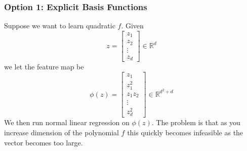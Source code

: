 \documentclass[11pt]{article}
\begin{document}
\subsubsection*{Option 1: Explicit Basis Functions}
Suppose we want to learn quadratic $f$. Given 
\[z = 
\begin{bmatrix}
z_1 \\ z_2 \\ \vdots \\ z_d
\end{bmatrix} \in \mathbb{R}^d
\] we let the feature map be
\[
\phi(z) = 
\begin{bmatrix}
z_1 \\ z_1^2 \\ z_1z_2 \\ \vdots \\ z_d^2
\end{bmatrix} \in \mathbb{R}^{d^2+d}
\]
We then run normal linear regression on $\phi(z)$. The problem is that as you increase dimension of the polynomial $f$ this quickly becomes infeasible as the vector becomes too large. 
\end{document}
